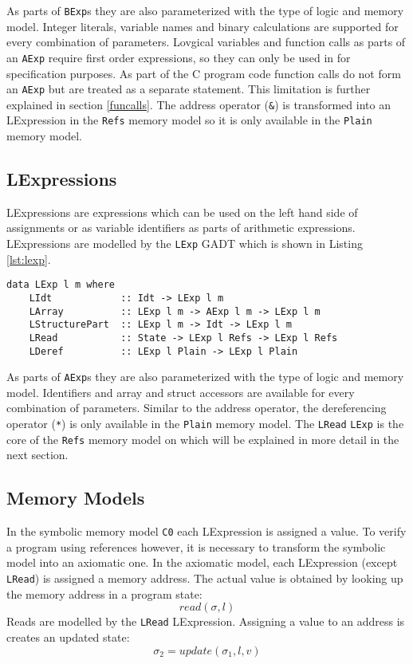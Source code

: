 \documentclass[12pt]{article}
\begin{document}
As parts of \texttt{BExp}s they are also parameterized with the type of logic and memory model.
Integer literals, variable names and binary calculations are supported for every combination of parameters.
Lovgical variables and function calls as parts of an \texttt{AExp} require first order expressions, so they can only be used in for specification purposes. 
As part of the C program code function calls do not form an \texttt{AExp} but are treated as a separate statement.
This limitation is further explained in section \ref{funcalls}.
The address operator (\texttt{\&}) is transformed into an LExpression in the \texttt{Refs} memory model so it is only available in the \texttt{Plain} memory model.

\subsection{LExpressions}
LExpressions are expressions which can be used on the left hand side of assignments or as variable identifiers as parts of arithmetic expressions. LExpressions are modelled by the \texttt{LExp} GADT which is shown in Listing \ref{lst:lexp}.

\begin{lstlisting}[style=c0, caption=LExp, label=lst:lexp]
data LExp l m where
    LIdt            :: Idt -> LExp l m
    LArray          :: LExp l m -> AExp l m -> LExp l m
    LStructurePart  :: LExp l m -> Idt -> LExp l m
    LRead           :: State -> LExp l Refs -> LExp l Refs
    LDeref          :: LExp l Plain -> LExp l Plain
\end{lstlisting}

As parts of \texttt{AExp}s they are also parameterized with the type of logic and memory model.
Identifiers and array and struct accessors are available for every combination of parameters.
Similar to the address operator, the dereferencing operator (\texttt{*}) is only available in the \texttt{Plain} memory model.
The \texttt{LRead} \texttt{LExp} is the core of the \texttt{Refs} memory model on which will be explained in more detail in the next section.


\subsection{Memory Models}
In the symbolic memory model \texttt{C0} each LExpression is assigned a value.
To verify a program using references however, it is necessary to transform the symbolic model into an axiomatic one.
In the axiomatic model, each LExpression (except \texttt{LRead}) is assigned a memory address.
The actual value is obtained by looking up the memory address in a program state:
\[ read(\sigma, l) \]
Reads are modelled by the \texttt{LRead} LExpression.
Assigning a value to an address is creates an updated state:
\[ \sigma_2 = update(\sigma_1, l, v) \]
\end{document}

